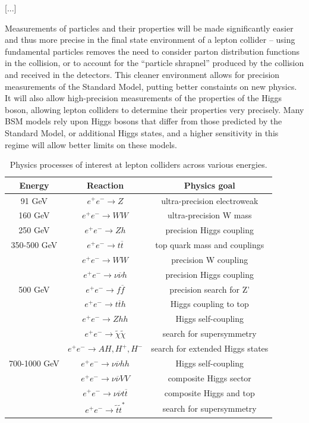 [...]

Measurements of particles and their properties will be made significantly easier and thus more precise in the final state environment of a lepton collider -- using fundamental particles removes the need to consider parton distribution functions in the collision, or to account for the ``particle shrapnel'' produced by the collision and received in the detectors. This cleaner environment allows for precision measurements of the Standard Model, putting better constaints on new physics. It will also allow high-precision measurements of the properties of the Higgs boson, allowing lepton colliders to determine their properties very precisely. Many BSM models rely upon Higgs bosons that differ from those predicted by the Standard Model, or additional Higgs states, and a higher sensitivity in this regime will allow better limits on these models. 

\begin{table}[h]
\centering
	\begin{tabular}{ c | c | c }
	\hline \hline
	\textbf{Energy} & \textbf{Reaction} & \textbf{Physics goal} \\ \hline
	 91 GeV & $e^+ e^- \rightarrow Z$ & ultra-precision electroweak \\ \hline
	 160 GeV & $e^+ e^- \rightarrow WW$ & ultra-precision W mass \\ \hline
	 250 GeV & $e^+ e^- \rightarrow Zh$ & precision Higgs coupling \\ \hline
	 350-500 GeV & $e^+ e^- \rightarrow t\overline{t}$ & top quark mass and couplings \\
	   & $e^+ e^- \rightarrow WW$ & precision W coupling \\
	   & $e^+ e^- \rightarrow \nu \overline{\nu} h$ & precision Higgs coupling \\ \hline
	 500 GeV & $e^+ e^- \rightarrow f \overline{f}$ & precision search for Z' \\
	   & $e^+ e^- \rightarrow t \overline{t}h$ & Higgs coupling to top \\
	   & $e^+ e^- \rightarrow Zhh$ & Higgs self-coupling \\
	   & $e^+ e^- \rightarrow \widetilde{\chi} \widetilde{\chi}$ & search for supersymmetry \\
	   & $e^+ e^- \rightarrow AH, H^+, H^-$ & search for extended Higgs states \\ \hline
	 700-1000 GeV & $e^+ e^- \rightarrow \nu \overline{\nu} hh$ & Higgs self-coupling \\
	   & $e^+ e^- \rightarrow \nu \overline{\nu} VV$ & composite Higgs sector \\
	   & $e^+ e^- \rightarrow  \nu \overline{\nu} t \overline{t}$ & composite Higgs and top \\
	   & $e^+ e^- \rightarrow \tilde{t} \tilde{t}^*$ & search for supersymmetry \\ \hline
	\end{tabular}
	\caption{Physics processes of interest at lepton colliders across various energies.}
	\label{table:colliders/physics-goals}
\end{table}

